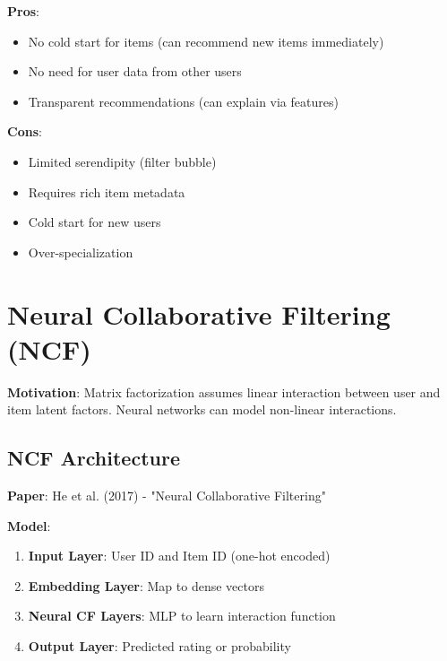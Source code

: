\documentclass[10pt]{article}
\begin{document}
\textbf{Pros}:
\begin{itemize}[leftmargin=*]
    \item No cold start for items (can recommend new items immediately)
    \item No need for user data from other users
    \item Transparent recommendations (can explain via features)
\end{itemize}

\textbf{Cons}:
\begin{itemize}[leftmargin=*]
    \item Limited serendipity (filter bubble)
    \item Requires rich item metadata
    \item Cold start for new users
    \item Over-specialization
\end{itemize}

\section{Neural Collaborative Filtering (NCF)}

\textbf{Motivation}: Matrix factorization assumes linear interaction between user and item latent factors. Neural networks can model non-linear interactions.

\subsection{NCF Architecture}

\textbf{Paper}: He et al. (2017) - "Neural Collaborative Filtering"

\textbf{Model}:
\begin{enumerate}[leftmargin=*]
    \item \textbf{Input Layer}: User ID and Item ID (one-hot encoded)
    \item \textbf{Embedding Layer}: Map to dense vectors
    \item \textbf{Neural CF Layers}: MLP to learn interaction function
    \item \textbf{Output Layer}: Predicted rating or probability
\end{enumerate}
\end{document}

